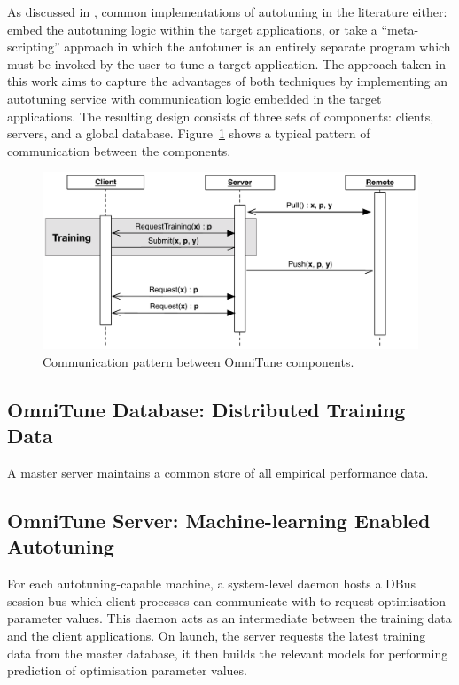 As discussed in , common implementations of
autotuning in the literature either: embed the autotuning logic within
the target applications, or take a ``meta-scripting'' approach in
which the autotuner is an entirely separate program which must be
invoked by the user to tune a target application. The approach taken
in this work aims to capture the advantages of both techniques by
implementing an autotuning service with communication logic embedded
in the target applications. The resulting design consists of three
sets of components: clients, servers, and a global
database. Figure~\ref{fig:omnitune-comms} shows a typical pattern of
communication between the components.

\begin{figure}
\centering
\includegraphics[width=.8\textwidth]{img/omnitune-comms}
\caption{%
  Communication pattern between OmniTune components.%
}
\label{fig:omnitune-comms}
\end{figure}



\subsection{OmniTune Database: Distributed Training Data}

A master server maintains a common store of all empirical performance
data. 


\subsection{OmniTune Server: Machine-learning Enabled Autotuning}

For each autotuning-capable machine, a system-level daemon hosts a
DBus session bus which client processes can communicate with to
request optimisation parameter values. This daemon acts as an
intermediate between the training data and the client applications. On
launch, the server requests the latest training data from the master
database, it then builds the relevant models for performing prediction
of optimisation parameter values.

